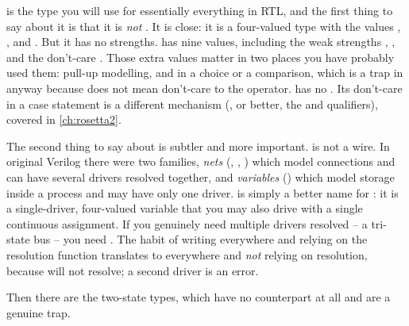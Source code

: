  is the type you will use for
essentially everything in RTL, and the first thing to say about it is that it
is \emph{not} . It is close: it is a four-valued type with the
values , ,  and . But it has no strengths.
 has nine values, including the weak strengths ,
,  and the don't-care \code{-}. Those extra values matter in
two places you have probably used them: pull-up modelling, and \code{-} in a
 choice or a comparison, which is a trap in \VHDL{} anyway because
\code{-} does not mean don't-care to the \code{=} operator. \SV{} has no
\code{-}. Its don't-care in a case statement is a different mechanism
(, or better, the  and  qualifiers),
covered in \cref{ch:rosetta2}.

The second thing to say about  is subtler and more important.
 is not a wire. In original Verilog there were two families,
\emph{nets} (, , ) which model connections and
can have several drivers resolved together, and \emph{variables} ()
which model storage inside a process and may have only one driver.
 is simply a better name for : it is
a single-driver, four-valued variable that you may also drive with a single
continuous assignment. If you genuinely need multiple drivers resolved -- a
tri-state bus -- you need . The \VHDL{} habit of writing
 everywhere and relying on the resolution function translates
to  everywhere and \emph{not} relying on resolution, because
 will not resolve; a second driver is an error.

Then there are the two-state types, which have no \VHDL{} counterpart at all
and are a genuine trap.

